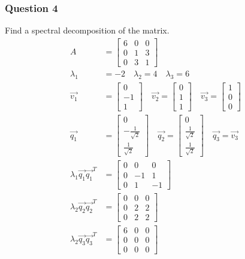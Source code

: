 \documentclass{math}
\begin{document}
\subsubsection*{Question 4}
Find a spectral decomposition of the matrix.
\begin{align*}
  A &= \begin{bmatrix}
    6 & 0 & 0 \\
    0 & 1 & 3 \\
    0 & 3 & 1
  \end{bmatrix} \\
  \lambda_1 &= -2 \quad \lambda_2 = 4 \quad \lambda_3 = 6 \\
  \vec{v_1} &= \begin{bmatrix}0 \\ -1 \\ 1\end{bmatrix} \quad
    \vec{v_2} = \begin{bmatrix}0 \\ 1 \\ 1\end{bmatrix} \quad
    \vec{v_3} = \begin{bmatrix}1 \\ 0 \\ 0\end{bmatrix} \\
  \vec{q_1} &= \begin{bmatrix}
    0 \\ -\frac{1}{\sqrt{2}} \\ \frac{1}{\sqrt{2}}
  \end{bmatrix} \quad \vec{q_2} = \begin{bmatrix}
    0 \\ \frac{1}{\sqrt{2}} \\ \frac{1}{\sqrt{2}}
  \end{bmatrix} \quad \vec{q_3} = \vec{v_3} \\
  \lambda_1\vec{q_1}\vec{q_1}^T &= \begin{bmatrix}
    0 & 0 & 0 \\
    0 & -1 & 1 \\
    0 & 1 & -1
  \end{bmatrix} \\
  \lambda_2\vec{q_2}\vec{q_2}^T &= \begin{bmatrix}
    0 & 0 & 0 \\
    0 & 2 & 2 \\
    0 & 2 & 2
  \end{bmatrix} \\
  \lambda_2\vec{q_3}\vec{q_3}^T &= \begin{bmatrix}
    6 & 0 & 0 \\
    0 & 0 & 0 \\
    0 & 0 & 0
  \end{bmatrix}
\end{align*}
\end{document}
